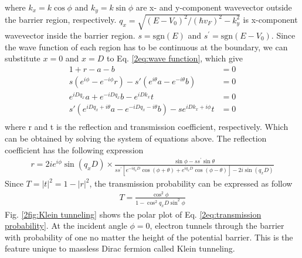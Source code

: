     where $k_x = k \cos{\phi}$ and $k_y = k \sin{\phi}$ are x- and y-component wavevector outside the barrier region, respectively.
    $q_x = \sqrt{(E-V_0)^2/(\hbar v_F)^2-k_y^2}$ is x-component wavevector inside the barrier region. 
    $s = \mathrm{sgn}(E)$ and $s^{\prime} = \mathrm{sgn}(E-V_0)$. 
    Since the wave function of each region has to be continuous at the boundary, we can substitute $x = 0$ and $x = D$ to Eq. \ref{2eq:wave function}, which give
    \begin{equation} \label{2eq:boundary condition}
        \begin{aligned}
            1+r-a-b&=0\\
            s(e^{i\phi}-e^{-i\phi}r)-s\prime (e^{i\theta}a-e^{-i\theta}b)&=0\\
            e^{iDq_x}a+e^{-iDq_x}b-e^{iDk_x}t&=0\\
            s \prime (e^{iDq_x+i\theta}a-e^{-iDq_x-i\theta} b)-se^{iDk_x+i\phi}t&=0\\
        \end{aligned}
    \end{equation}
    where r and t is the reflection and transmission coefficient, respectively. Which can be obtained by solving the system of equations above.
    The reflection coefficient has the following expression
    \begin{align} \label{2eq:reflection coefficient}
        r=2ie^{i\phi}\sin{(q_xD)}\times\frac{\sin{\phi}-ss^{\prime}\sin{\theta}}{ss^{\prime}[e^{-iq_xD}\cos{(\phi+\theta)}+e^{iq_xD}\cos{(\phi-\theta)}]-2i\sin{(q_xD)}}
    \end{align}
    Since $T = |t|^2 = 1-|r|^2$, the transmission probability can be expressed as follow
    \begin{align} \label{2eq:transmission probability}
        T = \frac{\cos^2{\phi}}{1-\cos^2{q_x D}\sin^2{\phi}}
    \end{align}
    Fig. \ref{2fig:Klein tunneling} shows the polar plot of Eq. \ref{2eq:transmission probability}. 
    At the incident angle $\phi = 0$, electron tunnels through the barrier with probability of one no matter the height of the potential barrier.
    This is the feature unique to massless Dirac fermion called Klein tunneling.
